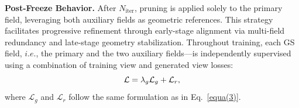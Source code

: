\textbf{Post-Freeze Behavior.} After \( N_{\mathrm{iter}} \), pruning is applied solely to the primary field, leveraging both auxiliary fields as geometric references. This strategy facilitates progressive refinement through early-stage alignment via multi-field redundancy and late-stage geometry stabilization.
Throughout training, each GS field, $i.e$., the primary and the two auxiliary fields—is independently supervised using a combination of training view and generated view losses:
\begin{equation}
\small
\mathcal{L} = \lambda_{g}\mathcal{L}_{g}+\mathcal{L}_{r},
\end{equation}
where $\mathcal{L}_{g}$ and $\mathcal{L}_{r}$ follow the same formulation as in Eq.~\ref{equa(3)}.




















